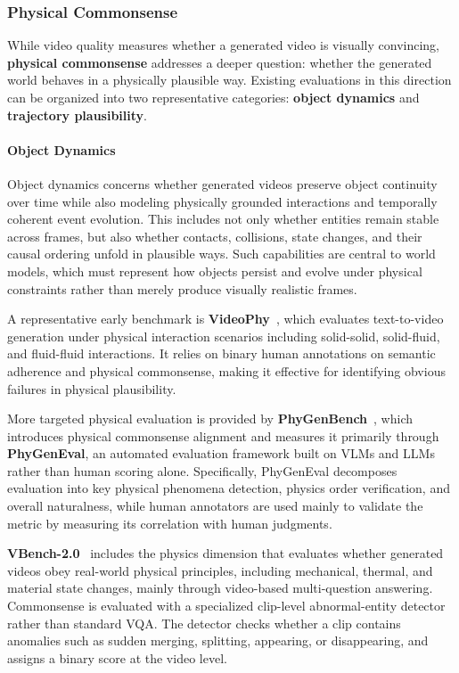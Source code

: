 
\subsubsection{Physical Commonsense}
\label{sec:eval_world_physical}
While video quality measures whether a generated video is visually convincing, \textbf{physical commonsense} addresses a deeper question: whether the generated world behaves in a physically plausible way. Existing evaluations in this direction can be organized into two representative categories: \textbf{object dynamics} and \textbf{trajectory plausibility}.


\paragraph{Object Dynamics}
Object dynamics concerns whether generated videos preserve object continuity over time while also modeling physically grounded interactions and temporally coherent event evolution. This includes not only whether entities remain stable across frames, but also whether contacts, collisions, state changes, and their causal ordering unfold in plausible ways. Such capabilities are central to world models, which must represent how objects persist and evolve under physical constraints rather than merely produce visually realistic frames.

A representative early benchmark is \textbf{VideoPhy}~\citep{bansal2024videophy}, which evaluates text-to-video generation under physical interaction scenarios including solid-solid, solid-fluid, and fluid-fluid interactions. It relies on binary human annotations on semantic adherence and physical commonsense, making it effective for identifying obvious failures in physical plausibility. 

More targeted physical evaluation is provided by \textbf{PhyGenBench}~\citep{meng2024phygenbench}, which introduces physical commonsense alignment and measures it primarily through \textbf{PhyGenEval}, an automated evaluation framework built on VLMs and LLMs rather than human scoring alone. Specifically, PhyGenEval decomposes evaluation into key physical phenomena detection, physics order verification, and overall naturalness, while human annotators are used mainly to validate the metric by measuring its correlation with human judgments. 

\textbf{VBench-2.0}~\citep{zheng2025vbench} includes the physics dimension that evaluates whether generated videos obey real-world physical principles, including mechanical, thermal, and material state changes, mainly through video-based multi-question answering. Commonsense is evaluated with a specialized clip-level abnormal-entity detector rather than standard VQA. The detector checks whether a clip contains anomalies such as sudden merging, splitting, appearing, or disappearing, and assigns a binary score at the video level.

